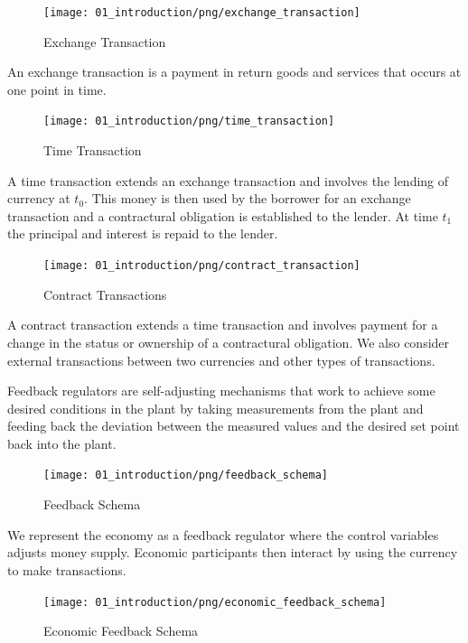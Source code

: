 \begin{figure}[H]
\centering
\texttt{[image: 01\_introduction/png/exchange\_transaction]}
\caption{Exchange Transaction}
\label{fig:exchange_transaction1}
\end{figure}

An exchange transaction is a payment in return goods and services that occurs at one
point in time.

\begin{figure}[H]
\centering
\texttt{[image: 01\_introduction/png/time\_transaction]}
\caption{Time Transaction}
\label{fig:time_transaction1}
\end{figure}

A time transaction extends an exchange transaction and involves the lending of currency at $t_0$.
This money is then used by the borrower for an exchange transaction and a contractural obligation is
established to the lender. At time $t_1$ the principal and interest is repaid to the lender.

\begin{figure}[H]
\centering
\texttt{[image: 01\_introduction/png/contract\_transaction]}
\caption{Contract Transactions}
\label{fig:contract_transaction1}
\end{figure}

A contract transaction extends a time transaction and involves payment for a change in the status or
ownership of a contractural obligation. We also consider external transactions between two
currencies and other types of transactions.

Feedback regulators are self-adjusting mechanisms that work to achieve some desired conditions in
the plant by taking measurements from the plant and feeding back the deviation between the measured
values and the desired set point back into the plant.

\begin{figure}[H]
\centering
\texttt{[image: 01\_introduction/png/feedback\_schema]}
\caption{Feedback Schema}
\label{fig:feedback_schema1}
\end{figure}

We represent the economy as a feedback regulator where the control variables adjusts money supply.
Economic participants then interact by using the currency to make transactions. 

\begin{figure}[H]
\centering
\texttt{[image: 01\_introduction/png/economic\_feedback\_schema]}
\caption{Economic Feedback Schema}
\label{fig:economic_feedback_schema1}
\end{figure}


